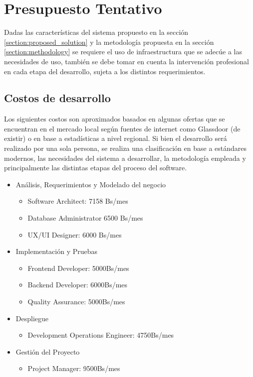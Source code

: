 \section{Presupuesto Tentativo}

Dadas las características del sistema propuesto en la sección \ref{section:proposed_solution} y la metodología propuesta en la sección \ref{section:methodology} se requiere el uso de infraestructura que se adecúe a las necesidades de uso, también se debe tomar en cuenta la intervención profesional en cada etapa del desarrollo, sujeta a los distintos requerimientos.

\subsection{Costos de desarrollo}

Los siguientes costos son aproximados basados en algunas ofertas que se encuentran en el mercado local según fuentes de internet como Glassdoor (de existir) o en base a estadísticas a nivel regional. Si bien el desarrollo será realizado por una sola persona, se realiza una clasificación en base a estándares modernos, las necesidades del sistema a desarrollar, la metodología empleada y principalmente las distintas etapas del proceso del software.

\begin{itemize}
  \item Análisis, Requerimientos y Modelado del negocio
        \begin{itemize}
          \item Software Architect: 7158 Bs/mes
          \item Database Administrator 6500 Bs/mes
          \item UX/UI Designer: 6000 Bs/mes
        \end{itemize}
  \item Implementación y Pruebas
        \begin{itemize}
          \item Frontend Developer: 5000Bs/mes
          \item Backend Developer: 6000Bs/mes
          \item Quality Assurance: 5000Bs/mes
        \end{itemize}
  \item Despliegue
        \begin{itemize}
          \item Development Operations Engineer: 4750Bs/mes
        \end{itemize}
  \item Gestión del Proyecto
        \begin{itemize}
          \item Project Manager: 9500Bs/mes
        \end{itemize}
\end{itemize}

